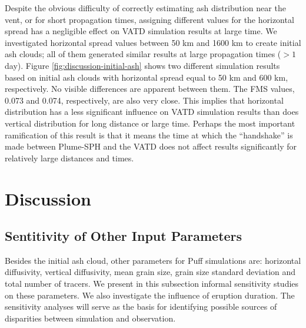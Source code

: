 \documentclass[utf8]{frontiersSCNS} %
\begin{document}
Despite the obvious difficulty of correctly estimating ash distribution near the vent, or for short propagation times, assigning different values for the horizontal spread has a negligible effect on VATD simulation results at large time. We investigated horizontal spread values between 50 km and 1600 km to create initial ash clouds; all of them generated similar results at large propagation times ($> 1$ day). Figure \ref{fig:discussion-initial-ash} shows two different simulation results based on initial ash clouds with horizontal spread equal to 50 km and 600 km, respectively. No visible differences are apparent between them. The FMS values, 0.073 and 0.074, respectively,  are also very close. This implies that horizontal distribution has a less significant influence on VATD simulation results than does vertical distribution for long distance or large time.  Perhaps the most important ramification of this result is that it means the time at which the ``handshake'' is made between Plume-SPH and the VATD does not affect results significantly for relatively large distances and times.

\section{Discussion}
\subsection{Sentitivity of Other Input Parameters}
Besides the initial ash cloud, other parameters for Puff simulations are: horizontal diffusivity, vertical diffusivity, mean grain size, grain size standard deviation and total number of tracers. We present in this subsection informal sensitivity studies on these parameters. We also investigate the influence of eruption duration. The sensitivity analyses will serve as the basis for identifying possible sources of disparities between simulation and observation.
\end{document}
